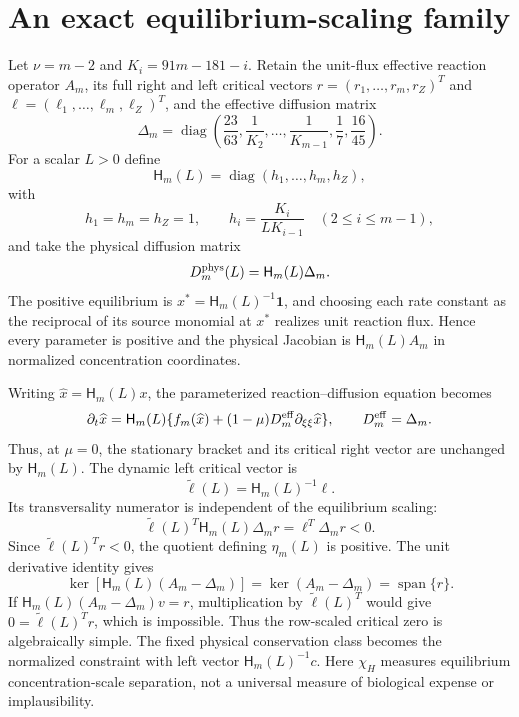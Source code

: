 \section*{An exact equilibrium-scaling family}
Let $\nu=m-2$ and $K_i=91m-181-i$.  Retain the unit-flux effective reaction
operator $A_m$, its full right and left critical vectors
$r=(r_1,\ldots,r_m,r_Z)^T$ and
$\ell=(\ell_1,\ldots,\ell_m,\ell_Z)^T$, and the effective diffusion matrix
\[
 \Delta_m=\operatorname{diag}\left(
 \frac{23}{63},\frac1{K_2},\ldots,\frac1{K_{m-1}},
 \frac17,\frac{16}{45}\right).
\]
For a scalar $L>0$ define
\[
 \mathsf H_m(L)=\operatorname{diag}(h_1,\ldots,h_m,h_Z),
\]
with
\[
 h_1=h_m=h_Z=1,
 \qquad
 h_i=\frac{K_i}{L K_{i-1}}
 \quad(2\le i\le m-1),
\]
and take the physical diffusion matrix
\[
 D_m^{\rm phys}(L)=\mathsf H_m(L)\Delta_m.
\]
The positive equilibrium is $x^*=\mathsf H_m(L)^{-1}\mathbf1$, and choosing each
rate constant as the reciprocal of its source monomial at $x^*$ realizes
unit reaction flux.  Hence every parameter is positive and the physical
Jacobian is $\mathsf H_m(L)A_m$ in normalized concentration coordinates.

Writing $\widehat x=\mathsf H_m(L)x$, the parameterized reaction--diffusion
equation becomes
\[
 \partial_t\widehat x=\mathsf H_m(L)
 \{f_m(\widehat x)+(1-\mu)D_m^{\rm eff}
 \partial_{\xi\xi}\widehat x\},
 \qquad D_m^{\rm eff}=\Delta_m.
\]
Thus, at $\mu=0$, the stationary bracket and its critical right vector are
unchanged by $\mathsf H_m(L)$.  The dynamic left critical vector is
\[
 \widetilde\ell(L)=\mathsf H_m(L)^{-1}\ell.
\]
Its transversality numerator is independent of the equilibrium scaling:
\[
 \widetilde\ell(L)^T\mathsf H_m(L)\Delta_m r
 =\ell^T\Delta_m r<0.
\]
Since $\widetilde\ell(L)^Tr<0$, the quotient defining
$\eta_m(L)$ is positive.
The unit derivative identity gives
\[
 \ker[\mathsf H_m(L)(A_m-\Delta_m)]
 =\ker(A_m-\Delta_m)=\operatorname{span}\{r\}.
\]
If $\mathsf H_m(L)(A_m-\Delta_m)v=r$, multiplication by
$\widetilde\ell(L)^T$ would give
$0=\widetilde\ell(L)^Tr$, which is impossible.  Thus the row-scaled
critical zero is algebraically simple.
The fixed physical conservation class becomes the normalized constraint with
left vector $\mathsf H_m(L)^{-1}c$.
Here $\chi_H$ measures equilibrium concentration-scale separation, not a
universal measure of biological expense or implausibility.



